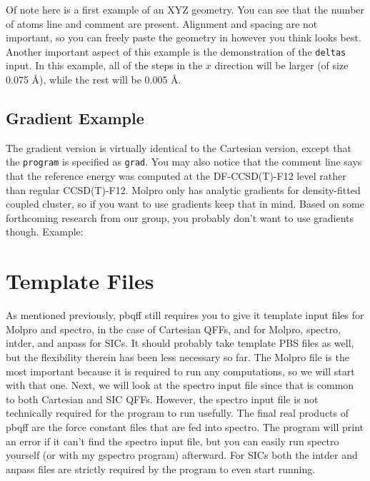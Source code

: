 \documentclass{article}
\begin{document}
Of note here is a first example of an XYZ geometry. You can see that
the number of atoms line and comment are present. Alignment and
spacing are not important, so you can freely paste the geometry in
however you think looks best. Another important aspect of this example
is the demonstration of the \verb|deltas| input. In this example, all
of the steps in the $x$ direction will be larger (of size 0.075
\AA{}), while the rest will be 0.005 \AA{}.

\subsection{Gradient Example}

The gradient version is virtually identical to the Cartesian version,
except that the \verb|program| is specified as \verb|grad|. You may
also notice that the comment line says that the reference energy was
computed at the DF-CCSD(T)-F12 level rather than regular
CCSD(T)-F12. Molpro only has analytic gradients for density-fitted
coupled cluster, so if you want to use gradients keep that in
mind. Based on some forthcoming research from our group, you probably
don't want to use gradients though. Example:



\section{Template Files}

As mentioned previously, pbqff still requires you to give it template
input files for Molpro and spectro, in the case of Cartesian QFFs, and
for Molpro, spectro, intder, and anpass for SICs. It should probably
take template PBS files as well, but the flexibility therein has been
less necessary so far. The Molpro file is the most important because
it is required to run any computations, so we will start with that
one. Next, we will look at the spectro input file since that is common
to both Cartesian and SIC QFFs. However, the spectro input file is not
technically required for the program to run usefully. The final real
products of pbqff are the force constant files that are fed into
spectro. The program will print an error if it can't find the spectro
input file, but you can easily run spectro yourself (or with my
gspectro program) afterward. For SICs both the intder and anpass files
are strictly required by the program to even start running.
\end{document}
